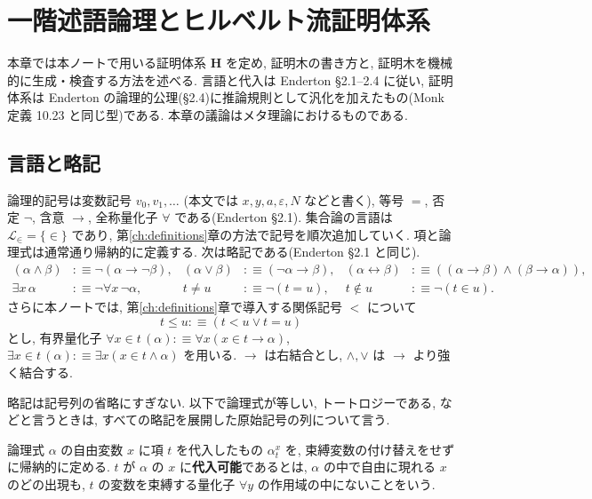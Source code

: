\chapter{一階述語論理とヒルベルト流証明体系}\label{ch:logic}

本章では本ノートで用いる証明体系 $\mathbf{H}$ を定め, 証明木の書き方と, 証明木を機械的に生成・検査する方法を述べる. 言語と代入は Enderton \cite{enderton} \S 2.1--2.4 に従い, 証明体系は Enderton の論理的公理(\S 2.4)に推論規則として汎化を加えたもの(Monk \cite{monk} 定義 10.23 と同じ型)である. 本章の議論はメタ理論におけるものである.

\section{言語と略記}

論理的記号は変数記号 $v_0, v_1, \ldots$ (本文では $x, y, a, \varepsilon, N$ などと書く), 等号 $=$, 否定 $\neg$, 含意 $\to$, 全称量化子 $\forall$ である(Enderton \cite{enderton} \S 2.1). 集合論の言語は $\mathcal{L}_\in = \{\in\}$ であり, 第\ref{ch:definitions}章の方法で記号を順次追加していく. 項と論理式は通常通り帰納的に定義する. 次は略記である(Enderton \S 2.1 と同じ).
\begin{align*}
  (\alpha \land \beta) &:\equiv \neg(\alpha \to \neg\beta), & (\alpha \lor \beta) &:\equiv (\neg\alpha \to \beta), & (\alpha \leftrightarrow \beta) &:\equiv ((\alpha \to \beta) \land (\beta \to \alpha)), \\
  \exists x\,\alpha &:\equiv \neg\forall x\,\neg\alpha, & t \neq u &:\equiv \neg(t = u), & t \notin u &:\equiv \neg(t \in u).
\end{align*}
さらに本ノートでは, 第\ref{ch:definitions}章で導入する関係記号 $<$ について
\[ t \leq u :\equiv (t < u \lor t = u) \]
とし, 有界量化子 $\forall x \in t\,(\alpha) :\equiv \forall x(x \in t \to \alpha)$, $\exists x \in t\,(\alpha) :\equiv \exists x(x \in t \land \alpha)$ を用いる. $\to$ は右結合とし, $\land, \lor$ は $\to$ より強く結合する.

略記は記号列の省略にすぎない. 以下で論理式が等しい, トートロジーである, などと言うときは, すべての略記を展開した原始記号の列について言う.

\begin{dfn}
  論理式 $\alpha$ の自由変数 $x$ に項 $t$ を代入したもの $\alpha^x_t$ を, 束縛変数の付け替えをせずに帰納的に定める. $t$ が $\alpha$ の $x$ に\textbf{代入可能}であるとは, $\alpha$ の中で自由に現れる $x$ のどの出現も, $t$ の変数を束縛する量化子 $\forall y$ の作用域の中にないことをいう.
\end{dfn}

